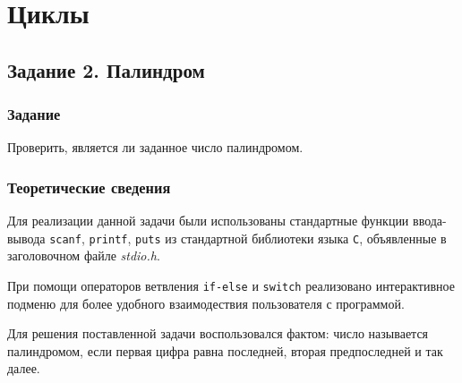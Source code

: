\documentclass[12pt,a4paper]{report}
\begin{document}
\chapter{Циклы}
\section{Задание 2. Палиндром}
\subsection{Задание}

\hspace{\parindent}Проверить, является ли заданное число палиндромом.

\subsection{Теоретические сведения}
\hspace{\parindent}Для реализации данной задачи были использованы стандартные функции ввода-вывода \texttt{scanf}, \texttt{printf}, \texttt{puts} из стандартной библиотеки языка \verb+С+, объявленные в заголовочном файле \textit{stdio.h}.

При помощи операторов ветвления \texttt{if-else} и \texttt{switch} реализовано интерактивное подменю для более удобного взаимодествия пользователя с программой.

Для решения поставленной задачи воспользовался фактом: число называется палиндромом, если первая цифра равна последней, вторая предпоследней и так далее.
\end{document}
